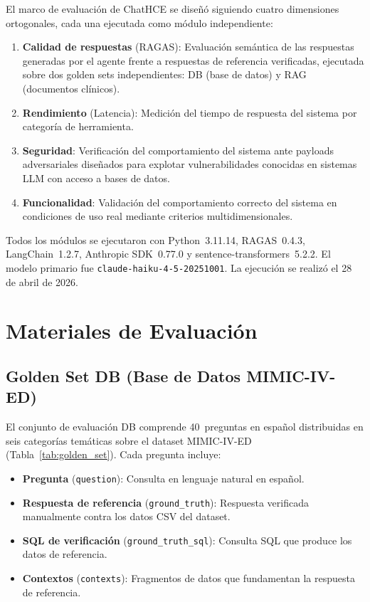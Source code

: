 \documentclass[11pt,a4paper,twocolumn]{article}
\begin{document}
El marco de evaluaci\'{o}n de ChatHCE se dise\~{n}\'{o} siguiendo cuatro dimensiones ortogonales, cada una ejecutada como m\'{o}dulo independiente:

\begin{enumerate}[nosep, leftmargin=*]
  \item \textbf{Calidad de respuestas} (RAGAS): Evaluaci\'{o}n sem\'{a}ntica de las respuestas generadas por el agente frente a respuestas de referencia verificadas, ejecutada sobre dos golden sets independientes: DB (base de datos) y RAG (documentos cl\'{i}nicos).
  \item \textbf{Rendimiento} (Latencia): Medici\'{o}n del tiempo de respuesta del sistema por categor\'{i}a de herramienta.
  \item \textbf{Seguridad}: Verificaci\'{o}n del comportamiento del sistema ante payloads adversariales dise\~{n}ados para explotar vulnerabilidades conocidas en sistemas LLM con acceso a bases de datos.
  \item \textbf{Funcionalidad}: Validaci\'{o}n del comportamiento correcto del sistema en condiciones de uso real mediante criterios multidimensionales.
\end{enumerate}

Todos los m\'{o}dulos se ejecutaron con Python~3.11.14, RAGAS~0.4.3, LangChain~1.2.7, Anthropic SDK~0.77.0 y sentence-transformers~5.2.2. El modelo primario fue \texttt{claude-haiku-4-5-20251001}. La ejecuci\'{o}n se realiz\'{o} el 28 de abril de 2026.

\section{Materiales de Evaluaci\'{o}n}
\label{sec:materiales}

\subsection{Golden Set DB (Base de Datos MIMIC-IV-ED)}

El conjunto de evaluaci\'{o}n DB comprende 40~preguntas en espa\~{n}ol distribuidas en seis categor\'{i}as tem\'{a}ticas sobre el dataset MIMIC-IV-ED (Tabla~\ref{tab:golden_set}). Cada pregunta incluye:

\begin{itemize}[nosep, leftmargin=*]
  \item \textbf{Pregunta} (\texttt{question}): Consulta en lenguaje natural en espa\~{n}ol.
  \item \textbf{Respuesta de referencia} (\texttt{ground\_truth}): Respuesta verificada manualmente contra los datos CSV del dataset.
  \item \textbf{SQL de verificaci\'{o}n} (\texttt{ground\_truth\_sql}): Consulta SQL que produce los datos de referencia.
  \item \textbf{Contextos} (\texttt{contexts}): Fragmentos de datos que fundamentan la respuesta de referencia.
\end{itemize}
\end{document}
